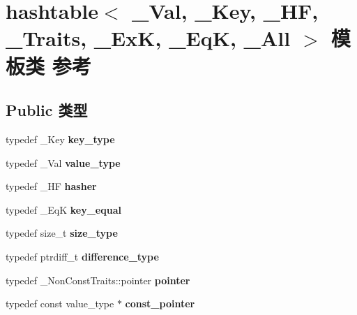 \hypertarget{classhashtable}{}\section{hashtable$<$ \+\_\+\+Val, \+\_\+\+Key, \+\_\+\+HF, \+\_\+\+Traits, \+\_\+\+ExK, \+\_\+\+EqK, \+\_\+\+All $>$ 模板类 参考}
\label{classhashtable}
\subsection*{Public 类型}
\begin{DoxyCompactItemize}
\item 
\mbox{\label{classhashtable_a402f8855090127ba82f6d4b50ed99441}} 
typedef \+\_\+\+Key {\bfseries key\+\_\+type}
\item 
\mbox{\label{classhashtable_a1f07261653b1fd662e29b923e1bdd65f}} 
typedef \+\_\+\+Val {\bfseries value\+\_\+type}
\item 
\mbox{\label{classhashtable_a0cd460e986b48a2c0e4f043ac69c915e}} 
typedef \+\_\+\+HF {\bfseries hasher}
\item 
\mbox{\label{classhashtable_a3a42422d16cf88f6a2db6bd5166fb242}} 
typedef \+\_\+\+EqK {\bfseries key\+\_\+equal}
\item 
\mbox{\label{classhashtable_af98123ca272bbb97b1c15059001450a7}} 
typedef size\+\_\+t {\bfseries size\+\_\+type}
\item 
\mbox{\label{classhashtable_a4b969dbfd1c2276e72d9e792e479ae6a}} 
typedef ptrdiff\+\_\+t {\bfseries difference\+\_\+type}
\item 
\mbox{\label{classhashtable_abc6b06fa89a7970bad281a83f61721e7}} 
typedef \+\_\+\+Non\+Const\+Traits\+::pointer {\bfseries pointer}
\item 
\mbox{\label{classhashtable_a3023697d5e7d67ff08094aa5f02eec4f}} 
typedef const value\+\_\+type $\ast$ {\bfseries const\+\_\+pointer}

\end{DoxyCompactItemize}
